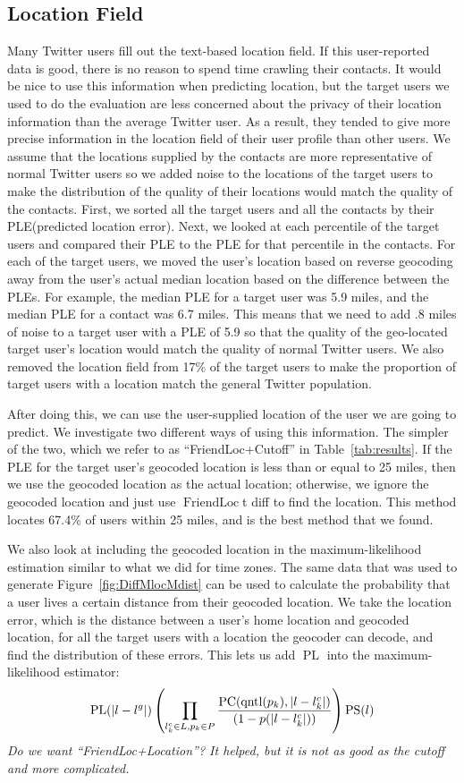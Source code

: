 \documentclass[letterpaper]{article}
\DeclareMathOperator{\pContact}{PC}
\DeclareMathOperator{\pLocation}{PL}
\DeclareMathOperator{\pStrangers}{PS}
\DeclareMathOperator{\FriendLoc}{FriendLoc}
\DeclareMathOperator{\quantile}{qntl}
\newcommand{\jam}[1]{\emph{#1}}
\newcommand{\flsec}[1]{\subsection{#1}}
\begin{document}
\flsec{Location Field}
Many Twitter users fill out the text-based location field.
%
If this user-reported data is good, there is no reason to spend time
crawling their contacts.
%
It would be nice to use this information when predicting location, but
the target users we used to do the evaluation are less concerned about
the privacy of their location information than the average Twitter user.
%
As a result, they tended to give more precise information in the location
field of their user profile than other users.
%
We assume that the locations supplied by the contacts are more
representative of normal Twitter users so we added noise to the locations
of the target users to make the distribution of the quality of their
locations would match the quality of the contacts.
%
First, we sorted all the target users and all the contacts by their
PLE(predicted location error).
%
Next, we looked at each percentile of the target users and compared
their PLE to the PLE for that percentile in the contacts.
%
For each of the target users, we moved the user's location based on
reverse geocoding away from the user's actual median location based on the
difference between the PLEs.
%
For example, the median PLE for a target user was 5.9 miles, and the median
PLE for a contact was 6.7 miles.
%
This means that we need to add .8 miles of noise to a target user
with a PLE of 5.9 so that the quality of the geo-located target user's location
would match the quality of normal Twitter users.
%
We also removed the location field from 17\% of the target users to
make the proportion of target users with a location match the general
Twitter population.

After doing this, we can use the user-supplied location of the user we are
going to predict.
%
We investigate two different ways of using this information.
%
The simpler of the two, which we refer to as ``FriendLoc+Cutoff'' in
Table~\ref{tab:results}.
%
If the PLE for the target user's geocoded location is less than or equal to 25
miles, then we use the geocoded location as the actual location; otherwise, we
ignore the geocoded location and just use $\FriendLoc$t diff to find the location.
%
This method locates 67.4\% of users within 25 miles, and is the best method
that we found.

We also look at including the geocoded location in the maximum-likelihood
estimation similar to what we did for time zones.
%
The same data that was used to generate Figure~\ref{fig:DiffMlocMdist} can be
used to calculate the probability that a user lives a certain distance from
their geocoded location.
%
We take the location error, which is the distance between a user's home
location and geocoded location, for all the target users with a location the
geocoder can decode, and find the distribution of these errors.
%
This lets us add $\pLocation$ into the maximum-likelihood estimator:
\[
    \pLocation(|l-l^g|)
    \left(
        \prod_{l^c_k \in L,p_k \in P}
        {\pContact(\quantile(p_k),|l-l^c_k|) \over (1-p(|l-l^c_k|))}
    \right)
    \pStrangers(l)
\]
\jam{Do we want ``FriendLoc+Location''? It helped, but it is not as good as the
    cutoff and more complicated.}
\end{document}
